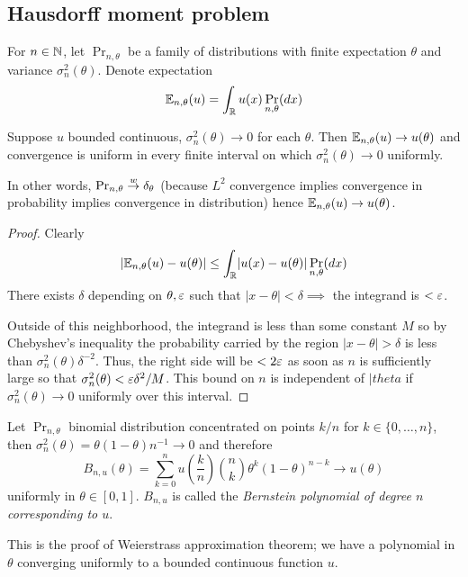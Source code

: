 \subsection{Hausdorff moment problem}

For $n \in \mathbb{N}$, let $\Pr_{n,\theta}$ be a family of distributions
with finite expectation $\theta$ and variance $\sigma_n^2(\theta)$.
Denote expectation
\[
  \mathbb{E}_{n,\theta}(u) = \int_{\mathbb{R}} u(x) \Pr_{n,\theta}(dx)
\]
\begin{lemma}
  Suppose $u$ bounded continuous, $\sigma_n^2(\theta) \to 0$ for each $\theta$.
  Then $\mathbb{E}_{n,\theta}(u) \to u(\theta)$ and convergence is uniform
  in every finite interval on which $\sigma_n^2(\theta) \to 0$ uniformly.
\end{lemma}
In other words, $\Pr_{n,\theta} \overset{w}{\to} \delta_\theta$ (because $L^2$ convergence
implies convergence in probability implies convergence in distribution)
hence $\mathbb{E}_{n,\theta}(u) \to u(\theta)$.

\begin{proof}
  Clearly
  \[
    \lvert \mathbb{E}_{n,\theta}(u) - u(\theta) \rvert
    \leq \int_{\mathbb{R}} \lvert u(x) - u(\theta)\rvert \Pr_{n,\theta}(dx)
  \]
  There exists $\delta$ depending on $\theta, \varepsilon$ such that
  $\lvert x - \theta \rvert < \delta \implies$ the integrand
  is $< \varepsilon$.

  Outside of this neighborhood, the integrand is less than some constant $M$
  so by Chebyshev's inequality the probability carried by the region
  $\lvert x - \theta \rvert > \delta$ is less than
  $\sigma_n^2(\theta) \delta^{-2}$.
  Thus, the right side will be $< 2 \varepsilon$ as soon as $n$ is sufficiently large
  so that $\sigma_n^2(\theta) < \varepsilon \delta^2 / M$.
  This bound on $n$ is independent of $|theta$ if $\sigma_n^2(\theta) \to 0$
  uniformly over this interval.
\end{proof}

\begin{example}
  \label{eg:binom-uniform-approx}
  Let $\Pr_{n,\theta}$ binomial distribution concentrated on points $k/n$
  for $k \in \{0,\ldots,n\}$, then $\sigma_n^2(\theta) = \theta (1 - \theta) n^{-1} \to 0$
  and therefore
  \[
    B_{n,u}(\theta) = \sum_{k = 0}^n u\left(\frac{k}{n} \right) \binom{n}{k} \theta^k (1 - \theta)^{n-k} \to u(\theta)
  \]
  uniformly in $\theta \in [0,1]$.
  $B_{n,u}$ is called the \emph{Bernstein polynomial of degree $n$ corresponding
  to $u$}.

  This is the proof of Weierstrass approximation theorem;
  we have a polynomial in $\theta$ converging uniformly
  to a bounded continuous function $u$.
\end{example}

